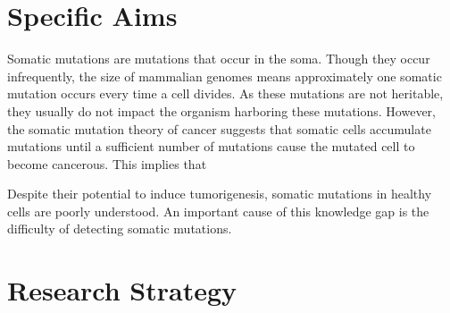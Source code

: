 \documentclass[12pt]{article}
\begin{document}
\section{Specific Aims} %

Somatic mutations are mutations that occur in the soma.
Though they occur infrequently, the size of mammalian genomes means approximately one somatic mutation occurs every time a cell divides.
As these mutations are not heritable, they usually do not impact the organism harboring these mutations.
However, the somatic mutation theory of cancer suggests that somatic cells accumulate mutations until a sufficient number of mutations cause the mutated cell to become cancerous.
This implies that 


Despite their potential to induce tumorigenesis, somatic mutations in healthy cells are poorly understood.
An important cause of this knowledge gap is the difficulty of detecting somatic mutations.




\section{Research Strategy} %

\end{document}
